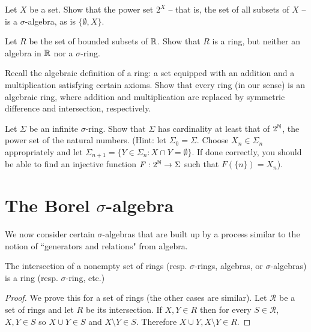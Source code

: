 \begin{exercise}
Let $X$ be a set.
Show that the power set $2^X$ -- that is, the set of all subsets of $X$ -- is a $\sigma$-algebra, as is $\{\emptyset, X\}$.
\end{exercise}

\begin{exercise}
Let $R$ be the set of bounded subsets of $\mathbb{R}$.
Show that $R$ is a ring, but neither an algebra in $\mathbb{R}$ nor a $\sigma$-ring.
\end{exercise}

\begin{exercise}
Recall the algebraic definition of a ring: a set equipped with an addition and a multiplication satisfying certain axioms.
Show that every ring (in our sense) is an algebraic ring, where addition and multiplication are replaced by symmetric difference and intersection, respectively.
\end{exercise}

\begin{exercise}
Let $\Sigma$ be an infinite $\sigma$-ring. Show that $\Sigma$ has cardinality at least that of $2^{\mathbb{N}}$, the power set of the natural numbers.
(Hint: let $\Sigma_0 = \Sigma$. Choose $X_n \in \Sigma_n$ appropriately and let $\Sigma_{n+1} = \{Y \in \Sigma_n: X \cap Y = \emptyset\}$. If done correctly, you should be able to find an injective function $F: 2^{\mathbb{N}} \to \Sigma$ such that $F(\{n\}) = X_n$).
\end{exercise}

\section{The Borel $\sigma$-algebra}
We now consider certain $\sigma$-algebras that are built up by a process similar to the notion of ``generators and relations" from algebra.

\begin{lemma}
\label{intersection of rings is ring}
The intersection of a nonempty set of rings (resp. $\sigma$-rings, algebras, or $\sigma$-algebras) is a ring (resp. $\sigma$-ring, etc.)
\end{lemma}
\begin{proof}
We prove this for a set of rings (the other cases are similar). Let $\mathcal R$ be a set of rings and let $R$ be its intersection.
If $X, Y \in R$ then for every $S \in \mathcal R$, $X, Y \in S$ so $X \cup Y \in S$ and $X \setminus Y \in S$.
Therefore $X \cup Y, X \setminus Y \in R$.
\end{proof}

